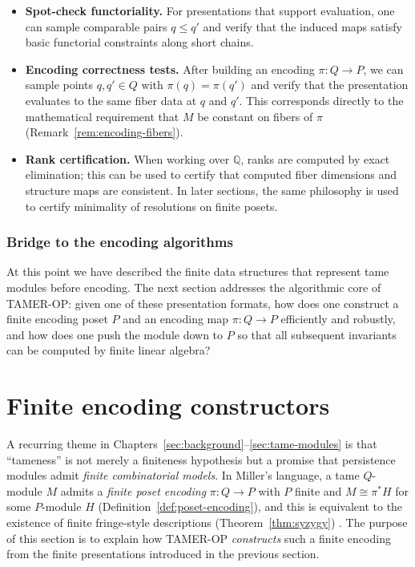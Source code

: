 \documentclass{article}
\newcommand{\<}{\langle}
\renewcommand{\>}{\rangle}
\theoremstyle{definition}
\theoremstyle{remark}
\begin{document}
	\begin{itemize}
		\item \textbf{Spot-check functoriality.}  For presentations that support evaluation, one can sample comparable
		pairs $q\le q'$ and verify that the induced maps satisfy basic functorial constraints along short chains.
		\item \textbf{Encoding correctness tests.}  After building an encoding $\pi\colon Q\to P$, we can sample points
		$q,q'\in Q$ with $\pi(q)=\pi(q')$ and verify that the presentation evaluates to the same fiber data at $q$ and $q'$.
		This corresponds directly to the mathematical requirement that $M$ be constant on fibers of $\pi$
		(Remark~\ref{rem:encoding-fibers}).
		\item \textbf{Rank certification.}  When working over $\mathbb{Q}$, ranks are computed by exact elimination; this
		can be used to certify that computed fiber dimensions and structure maps are consistent.  In later sections, the
		same philosophy is used to certify minimality of resolutions on finite posets.
	\end{itemize}
	
	\subsubsection*{Bridge to the encoding algorithms}
	
	At this point we have described the finite data structures that represent tame modules before encoding.
	The next section addresses the algorithmic core of TAMER-OP: given one of these presentation formats, how does one
	construct a finite encoding poset $P$ and an encoding map $\pi\colon Q\to P$ efficiently and robustly, and how does one
	push the module down to $P$ so that all subsequent invariants can be computed by finite linear algebra?
	
	
	\section{Finite encoding constructors}
	\label{sec:finite-encoding-constructors}
	
	A recurring theme in Chapters~\ref{sec:background}--\ref{sec:tame-modules} is that ``tameness'' is not merely a finiteness hypothesis but a promise that persistence modules admit \emph{finite combinatorial models}.  In Miller's language, a tame $Q$-module $M$ admits a \emph{finite poset encoding} $\pi\colon Q\to P$ with
	$P$ finite and $M\cong \pi^*H$ for some $P$-module $H$ (Definition~\ref{def:poset-encoding}), and this is equivalent to the existence of finite fringe-style descriptions (Theorem~\ref{thm:syzygy}) \cite{Mil20}. The purpose of this section is to explain how TAMER-OP \emph{constructs} such a finite encoding from the finite presentations introduced in the previous section.
	
\end{document}
